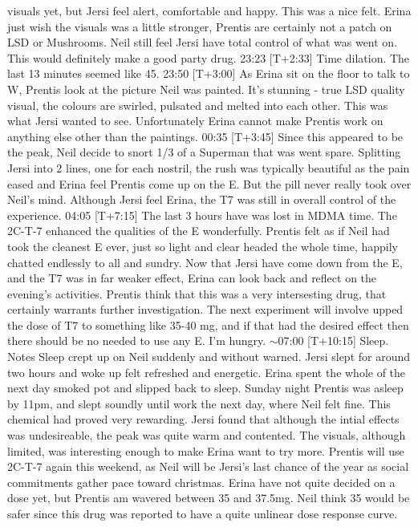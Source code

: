 \documentclass[12pt]{book}
\begin{document}
visuals yet, but Jersi feel alert, comfortable and happy. This was a nice felt. Erina just wish the visuals was a little stronger, Prentis are certainly not a patch on LSD or Mushrooms. Neil still feel Jersi have total control of what was went on. This would definitely make a good party drug. 23:23 [T+2:33] Time dilation. The last 13 minutes seemed like 45. 23:50 [T+3:00] As Erina sit on the floor to talk to W, Prentis look at the picture Neil was painted. It's stunning - true LSD quality visual, the colours are swirled, pulsated and melted into each other. This was what Jersi wanted to see. Unfortunately Erina cannot make Prentis work on anything else other than the paintings. 00:35 [T+3:45] Since this appeared to be the peak, Neil decide to snort 1/3 of a Superman that was went spare. Splitting Jersi into 2 lines, one for each nostril, the rush was typically beautiful as the pain eased and Erina feel Prentis come up on the E. But the pill never really took over Neil's mind. Although Jersi feel Erina, the T7 was still in overall control of the experience. 04:05 [T+7:15] The last 3  hours have was lost in MDMA time. The 2C-T-7 enhanced the qualities of the E wonderfully. Prentis felt as if Neil had took the cleanest E ever, just so light and clear headed the whole time, happily chatted endlessly to all and sundry. Now that Jersi have come down from the E, and the T7 was in far weaker effect, Erina can look back and reflect on the evening's activities. Prentis think that this was a very intersesting drug, that certainly warrants further investigation. The next experiment will involve upped the dose of T7 to something like 35-40 mg, and if that had the desired effect then there should be no needed to use any E. I'm hungry. $\sim$07:00 [T+10:15] Sleep. Notes Sleep crept up on Neil suddenly and without warned. Jersi slept for around two hours and woke up felt refreshed and energetic. Erina spent the whole of the next day smoked pot and slipped back to sleep. Sunday night Prentis was asleep by 11pm, and slept soundly until work the next day, where Neil felt fine. This chemical had proved very rewarding. Jersi found that although the intial effects was undesireable, the peak was quite warm and contented. The visuals, although limited, was interesting enough to make Erina want to try more. Prentis will use 2C-T-7 again this weekend, as Neil will be Jersi's last chance of the year as social commitments gather pace toward christmas. Erina have not quite decided on a dose yet, but Prentis am wavered between 35 and 37.5mg. Neil think 35 would be safer since this drug was reported to have a quite unlinear dose response curve.
\end{document}
